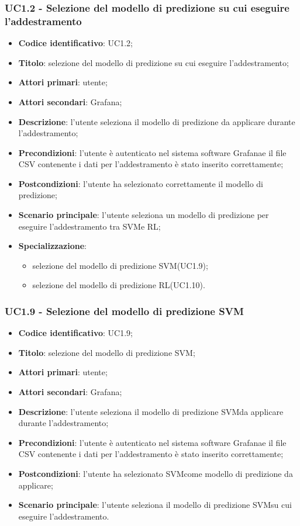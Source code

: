 \subsubsection{UC1.2 - Selezione del modello di predizione su cui eseguire l'addestramento}
\begin{itemize}
	\item \textbf{Codice identificativo}: UC1.2;
	\item \textbf{Titolo}: selezione del modello di predizione su cui eseguire l'addestramento;
	\item \textbf{Attori primari}: utente;
	\item \textbf{Attori secondari}: Grafana\glo;
	\item \textbf{Descrizione}: l'utente seleziona il modello di predizione da applicare durante l'addestramento;
	\item \textbf{Precondizioni}: l'utente è autenticato nel sistema software Grafana\glosp e il file CSV contenente i dati per l'addestramento è stato inserito correttamente;
	\item \textbf{Postcondizioni}: l'utente ha selezionato correttamente il modello di predizione;
	\item \textbf{Scenario principale}: l'utente seleziona un modello di predizione per eseguire l'addestramento tra SVM\glosp e RL\glo;
	\item \textbf{Specializzazione}:
	\begin{itemize}
		\item selezione del modello di predizione SVM\glosp (UC1.9);
		\item selezione del modello di predizione RL\glosp (UC1.10).
	\end{itemize}
\end{itemize}
\subsubsection{UC1.9 - Selezione del modello di predizione SVM}
\begin{itemize}
	\item \textbf{Codice identificativo}: UC1.9;
	\item \textbf{Titolo}: selezione del modello di predizione SVM\glo;
	\item \textbf{Attori primari}: utente;
	\item \textbf{Attori secondari}: Grafana\glo;
	\item \textbf{Descrizione}: l'utente seleziona il modello di predizione SVM\glosp da applicare durante l'addestramento;
	\item \textbf{Precondizioni}: l'utente è autenticato nel sistema software Grafana\glosp e il file CSV contenente i dati per l'addestramento è stato inserito correttamente;
	\item \textbf{Postcondizioni}: l'utente ha selezionato SVM\glosp come modello di predizione da applicare;
	\item \textbf{Scenario principale}: l'utente seleziona il modello di predizione SVM\glosp su cui eseguire l'addestramento.
\end{itemize}
